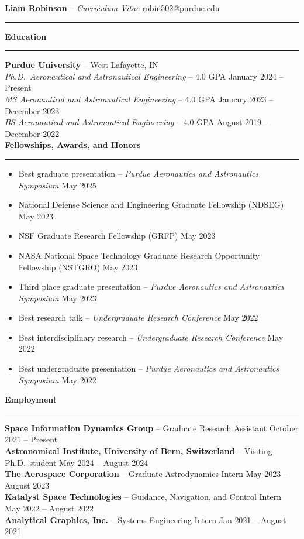 \documentclass[10pt, a4paper]{article}
\newcommand{\sectiontitle}[1]{{\Large \textbf{#1}}\vspace{0.5em}\hrule\vspace{0.5em}}
\begin{document}
\thispagestyle{empty}



\noindent
\textbf{\huge Liam Robinson }{\huge -- }\textit{\huge Curriculum Vitae} \hfill \href{mailto:robin502@purdue.edu}{robin502@purdue.edu}
\rule{\linewidth}{4pt}
\vspace{-0.5em}

\sectiontitle{Education}
\textbf{Purdue University} -- West Lafayette, IN \\
\textit{Ph.D.\ Aeronautical and Astronautical Engineering} -- 4.0 GPA \hfill January 2024 -- Present \\
\textit{MS Aeronautical and Astronautical Engineering} -- 4.0 GPA \hfill January 2023 -- December 2023 \\
\textit{BS Aeronautical and Astronautical Engineering} -- 4.0 GPA \hfill August 2019 -- December 2022 \\

\sectiontitle{Fellowships, Awards, and Honors}
\begin{itemize}[noitemsep]
    \item Best graduate presentation -- \textit{Purdue Aeronautics and Astronautics Symposium} \hfill May 2025
    \item National Defense Science and Engineering Graduate Fellowship (NDSEG) \hfill May 2023
    \item NSF Graduate Research Fellowship (GRFP) \hfill May 2023
    \item NASA National Space Technology Graduate Research Opportunity Fellowship (NSTGRO) \hfill May 2023
    \item Third place graduate presentation -- \textit{Purdue Aeronautics and Astronautics Symposium} \hfill May 2023
    \item Best research talk -- \textit{Undergraduate Research Conference} \hfill May 2022
    \item Best interdisciplinary research -- \textit{Undergraduate Research Conference} \hfill May 2022
    \item Best undergraduate presentation -- \textit{Purdue Aeronautics and Astronautics Symposium} \hfill May 2022
\end{itemize}

\sectiontitle{Employment}
\textbf{Space Information Dynamics Group} -- Graduate Research Assistant \hfill October 2021 -- Present \\
\textbf{Astronomical Institute, University of Bern, Switzerland} -- Visiting Ph.D.\ student \hfill May 2024 -- August 2024 \\
\textbf{The Aerospace Corporation} -- Graduate Astrodynamics Intern \hfill May 2023 -- August 2023 \\
\textbf{Katalyst Space Technologies} -- Guidance, Navigation, and Control Intern \hfill May 2022 -- August 2022 \\
\textbf{Analytical Graphics, Inc.} -- Systems Engineering Intern \hfill Jan 2021 -- August 2021 \\
\end{document}
